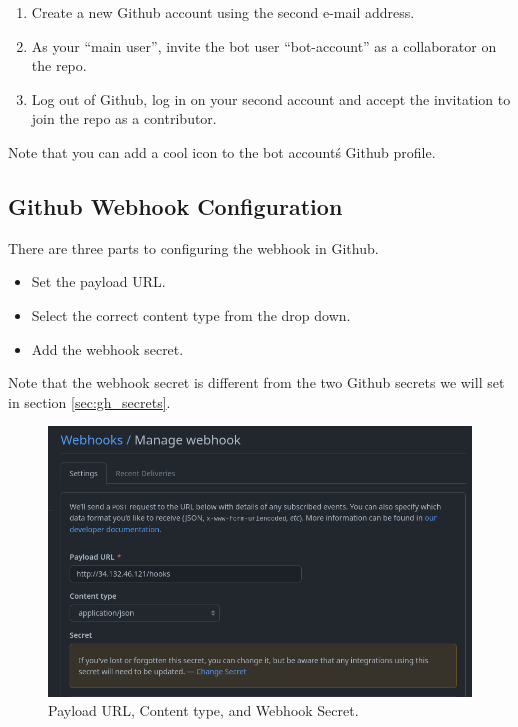 \justifying
\begin{raggedright}
	\begin{enumerate}
		\item Create a new Github account using the second e-mail address.
		\item As your ``main user'', invite the bot user ``bot-account'' as a collaborator on the repo.
		\item Log out of Github, log in on your second account and accept the invitation to join the repo as a contributor.
	\end{enumerate}
\end{raggedright}
\vspace{2mm}

\justifying
Note that you can add a cool icon to the bot account\'s Github profile.


\subsection{\label{sec:webhook}Github Webhook Configuration}

\justifying
There are three parts to configuring the webhook in Github. 

\justifying
\begin{raggedright}
	\begin{itemize}
		\item Set the payload URL.
		\item Select the correct content type from the drop down.
		\item Add the webhook secret.
	\end{itemize}
\end{raggedright}
\vspace{2mm}

\justifying
Note that the webhook secret is different from the two Github secrets we will set in section \ref{sec:gh_secrets}.

\begin{figure}[ht]
	\includegraphics[width=12cm]{images/webhook1.png}
	\caption{Payload URL, Content type, and Webhook Secret.}
	\label{wh1}
\end{figure}
\vspace{2mm}


